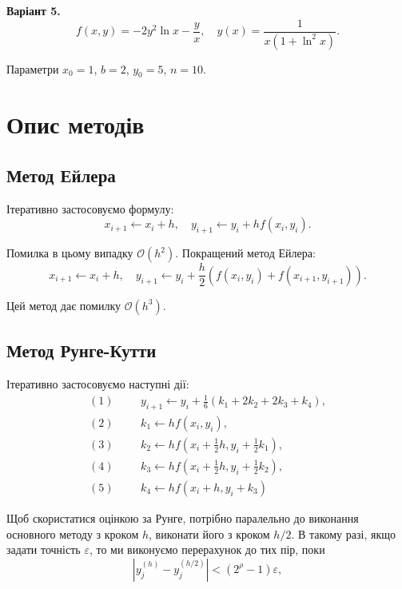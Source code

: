 \documentclass[14pt]{extarticle}
\begin{document}
\textbf{Варіант 5.}
\[
f(x,y) = -2y^2 \ln x - \frac{y}{x}, \quad y(x) = \frac{1}{x(1+\ln^2 x)}.
\]

Параметри $x_0=1$, $b=2$, $y_0=5$, $n=10$.

\pagebreak
\section{Опис методів}

\subsection{Метод Ейлера}

Ітеративно застосовуємо формулу:
\begin{equation*}
    x_{i+1} \gets x_i + h, \quad y_{i+1} \gets y_i + h f(x_i,y_i).
\end{equation*}

Помилка в цьому випадку $\mathcal{O}(h^2)$. Покращений метод Ейлера:
\begin{equation*}
    x_{i+1} \gets x_i + h, \quad y_{i+1} \gets y_i + \frac{h}{2}(f(x_i,y_i) + f(x_{i+1},y_{i+1})).
\end{equation*}

Цей метод дає помилку $\mathcal{O}(h^3)$.

\subsection{Метод Рунге-Кутти}

Ітеративно застосовуємо наступні дії:
\begin{align*}
    (1) &&& y_{i+1} \gets y_i + \frac{1}{6}\left(k_1+2k_2+2k_3+k_4\right), \\
    (2) &&& k_1 \gets hf(x_i,y_i), \\
    (3) &&& k_2 \gets hf(x_i+\frac{1}{2}h,y_i+\frac{1}{2}k_1), \\
    (4) &&& k_3 \gets hf(x_i+\frac{1}{2}h,y_i+\frac{1}{2}k_2), \\
    (5) &&& k_4 \gets hf(x_i+h,y_i+k_3)
\end{align*}

Щоб скористатися оцінкою за Рунге, потрібно паралельно до виконання основного методу
з кроком $h$, виконати його з кроком $h/2$. В такому разі, якщо задати точність 
$\varepsilon$, то ми виконуємо перерахунок до тих пір, поки
\begin{equation*}
    \left|y_j^{(h)} - y_j^{(h/2)}\right| < (2^{\rho}-1)\varepsilon,
\end{equation*}
\end{document}
